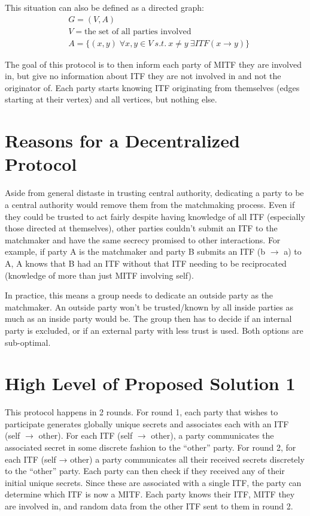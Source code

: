 \documentclass[conference]{IEEEtran}
\begin{document}
This situation can also be defined as a directed graph: 
\begin{align*}
& G=(V, A)\\
& V = \text{the set of all parties involved} \\
& A = \{(x,y)\; \forall x,y \in V \: s.t.\: x \neq y \: \exists ITF (x \rightarrow y)\}
\end{align*}

The goal of this protocol is to then inform each party of MITF they are involved in, but give no information about ITF they are not involved in and not the originator of. Each party starts knowing ITF originating from themselves (edges starting at their vertex) and all vertices, but nothing else.


\section{Reasons for a Decentralized Protocol}
Aside from general distaste in trusting central authority, dedicating a party to be a central authority would remove them from the matchmaking process. Even if they could be trusted to act fairly despite having knowledge of all ITF (especially those directed at themselves), other parties couldn’t submit an ITF to the matchmaker and have the same secrecy promised to other interactions. For example, if party A is the matchmaker and party B submits an ITF (b $\rightarrow$ a) to A, A knows that B had an ITF without that ITF needing to be reciprocated (knowledge of more than just MITF involving self).

In practice, this means a group needs to dedicate an outside party as the matchmaker. An outside party won’t be trusted/known by all inside parties as much as an inside party would be. The group then has to decide if an internal party is excluded, or if an external party with less trust is used. Both options are sub-optimal.


\section{High Level of Proposed Solution 1}
This protocol happens in 2 rounds. For round 1, each party that wishes to participate generates globally unique secrets and associates each with an ITF (self $\rightarrow$ other). For each ITF (self $\rightarrow$ other), a party communicates the associated secret in some discrete fashion to the “other” party. For round 2, for each ITF (self → other) a party communicates all their received secrets discretely to the “other” party. Each party can then check if they received any of their initial unique secrets. Since these are associated with a single ITF, the party can determine which ITF is now a MITF. Each party knows their ITF, MITF they are involved in, and random data from the other ITF sent to them in round 2.
\end{document}
